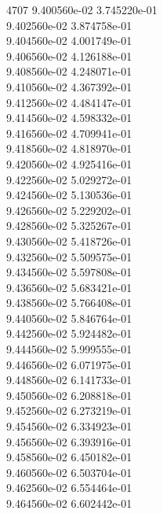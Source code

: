4707	9.400560e-02	3.745220e-01	\\ 	9.402560e-02	3.874758e-01	\\ 	9.404560e-02	4.001749e-01	\\ 	9.406560e-02	4.126188e-01	\\ 	9.408560e-02	4.248071e-01	\\ 	9.410560e-02	4.367392e-01	\\ 	9.412560e-02	4.484147e-01	\\ 	9.414560e-02	4.598332e-01	\\ 	9.416560e-02	4.709941e-01	\\ 	9.418560e-02	4.818970e-01	\\ 	9.420560e-02	4.925416e-01	\\ 	9.422560e-02	5.029272e-01	\\ 	9.424560e-02	5.130536e-01	\\ 	9.426560e-02	5.229202e-01	\\ 	9.428560e-02	5.325267e-01	\\ 	9.430560e-02	5.418726e-01	\\ 	9.432560e-02	5.509575e-01	\\ 	9.434560e-02	5.597808e-01	\\ 	9.436560e-02	5.683421e-01	\\ 	9.438560e-02	5.766408e-01	\\ 	9.440560e-02	5.846764e-01	\\ 	9.442560e-02	5.924482e-01	\\ 	9.444560e-02	5.999555e-01	\\ 	9.446560e-02	6.071975e-01	\\ 	9.448560e-02	6.141733e-01	\\ 	9.450560e-02	6.208818e-01	\\ 	9.452560e-02	6.273219e-01	\\ 	9.454560e-02	6.334923e-01	\\ 	9.456560e-02	6.393916e-01	\\ 	9.458560e-02	6.450182e-01	\\ 	9.460560e-02	6.503704e-01	\\ 	9.462560e-02	6.554464e-01	\\ 	9.464560e-02	6.602442e-01	\\ \hline
